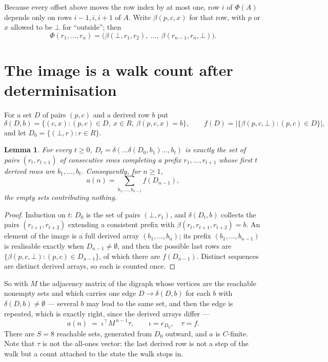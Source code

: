 \documentclass[11pt,a4paper]{article}
\theoremstyle{plain}
\newtheorem{lemma}[theorem]{Lemma}
\theoremstyle{definition}
\begin{document}
Because every offset above moves the row index by at most one, row $i$ of
$\Phi(A)$ depends only on rows $i-1,i,i+1$ of $A$. Write $\beta(p,c,x)$ for that row, with $p$
or $x$ allowed to be $\bot$ for ``outside''; then
\[
\Phi(r_1,\dots,r_n)=\bigl(\beta(\bot,r_1,r_2),\ \dots,\ \beta(r_{n-1},r_n,\bot)\bigr).
\]

\section{The image is a walk count after determinisation}

For a set $D$ of pairs $(p,c)$ and a derived row $b$ put
\[
\delta(D,b)=\{(c,x):(p,c)\in D,\ x\in R,\ \beta(p,c,x)=b\},\qquad
f(D)=\bigl|\{\beta(p,c,\bot):(p,c)\in D\}\bigr| ,
\]
and let $D_0=\{(\bot,r):r\in R\}$.

\begin{lemma}\label{lem:det}
For every $t\ge0$, $D_t=\delta(\dots\delta(D_0,b_1)\dots,b_t)$ is exactly the set of pairs
$(r_t,r_{t+1})$ of consecutive rows completing a prefix $r_1,\dots,r_{t+1}$ whose first $t$
derived rows are $b_1,\dots,b_t$. Consequently, for $n\ge1$,
\[
a(n)=\sum_{b_1,\dots,b_{n-1}}f(D_{n-1}),
\]
the empty sets contributing nothing.
\end{lemma}

\begin{proof}
Induction on $t$: $D_0$ is the set of pairs $(\bot,r_1)$, and $\delta(D_t,b)$ collects the
pairs $(r_{t+1},r_{t+2})$ extending a consistent prefix with
$\beta(r_t,r_{t+1},r_{t+2})=b$. An element of the image is a full derived array
$(b_1,\dots,b_n)$; its prefix $(b_1,\dots,b_{n-1})$ is realisable exactly when
$D_{n-1}\neq\emptyset$, and then the possible last rows are
$\{\beta(p,c,\bot):(p,c)\in D_{n-1}\}$, of which there are $f(D_{n-1})$. Distinct sequences
are distinct derived arrays, so each is counted once.
\end{proof}

So with $M$ the adjacency matrix of the digraph whose vertices are the reachable nonempty sets
and which carries one edge $D\to\delta(D,b)$ for each $b$ with $\delta(D,b)\neq\emptyset$ ---
several $b$ may lead to the same set, and then the edge is repeated, which is exactly right,
since the derived arrays differ ---
\[
a(n)\;=\;\iota^{\!\top}M^{\,n-1}\tau,\qquad \iota=e_{D_0},\quad \tau=f .
\]
There are $S=8$ reachable sets, generated from $D_0$ outward, and $a$ is $C$-finite.
Note that $\tau$ is not the all-ones vector: the last derived row is not a
step of the walk but a count attached to the state the walk stops in.
\end{document}
